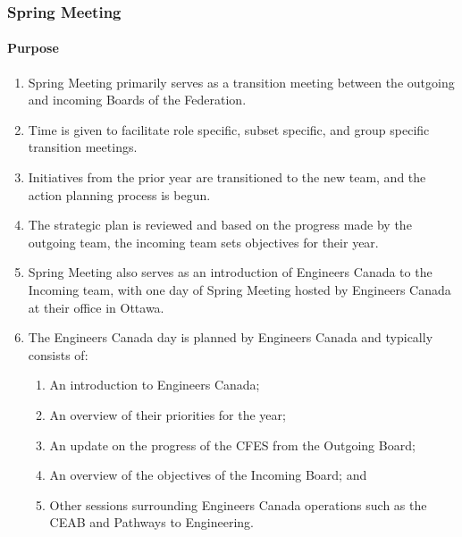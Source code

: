 \subsubsection{Spring Meeting}
\label{spring-meeting}

\paragraph{Purpose}
\begin{enumerate}
 \item
  Spring Meeting primarily serves as a transition meeting between the outgoing and incoming Boards of the Federation.
 \item
  Time is given to facilitate role specific, subset specific, and group specific transition meetings.
 \item
  Initiatives from the prior year are transitioned to the new team, and the action planning process is begun.
 \item
  The strategic plan is reviewed and based on the progress made by the outgoing team, the incoming team sets objectives for their year.
 \item
  Spring Meeting also serves as an introduction of Engineers Canada to the Incoming team, with one day of Spring Meeting hosted by Engineers Canada at their office in Ottawa.
 \item
  The Engineers Canada day is planned by Engineers Canada and typically consists of:

  \begin{enumerate}
   \item
    An introduction to Engineers Canada;
   \item
    An overview of their priorities for the year;
   \item
    An update on the progress of the CFES from the Outgoing Board;
   \item
    An overview of the objectives of the Incoming Board; and
   \item
    Other sessions surrounding Engineers Canada operations such as the CEAB and Pathways to Engineering.
  \end{enumerate}

\end{enumerate}

